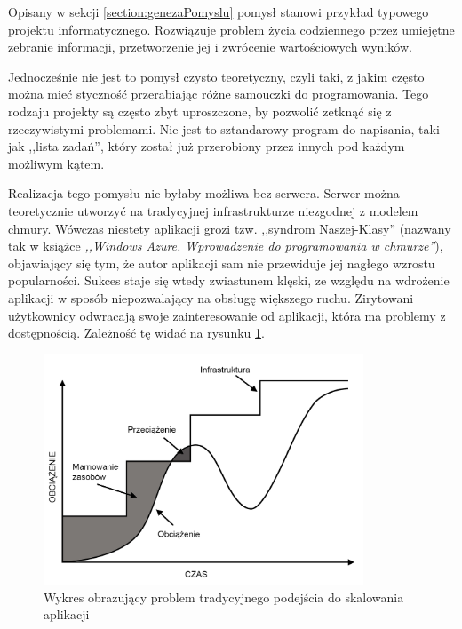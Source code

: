 \documentclass[12pt,a4paper,twoside,titlepage,openright]{book}
\begin{document}
Opisany w sekcji \ref{section:genezaPomyslu} pomysł stanowi przykład typowego projektu informatycznego. Rozwiązuje problem życia codziennego przez umiejętne zebranie informacji, przetworzenie jej i zwrócenie wartościowych wyników. 

Jednocześnie nie jest to pomysł czysto teoretyczny, czyli taki, z jakim często można mieć styczność przerabiając różne samouczki do programowania. Tego rodzaju projekty są często zbyt uproszczone, by pozwolić zetknąć się z rzeczywistymi problemami. Nie jest to sztandarowy program do napisania, taki jak ,,lista zadań'', który został już przerobiony przez innych pod każdym możliwym kątem.

Realizacja tego pomysłu nie byłaby możliwa bez serwera. Serwer można teoretycznie utworzyć na tradycyjnej infrastrukturze niezgodnej z modelem chmury. Wówczas niestety aplikacji grozi tzw. ,,syndrom Naszej-Klasy'' (nazwany tak w książce \textit{,,Windows Azure. Wprowadzenie do programowania w chmurze''}), objawiający się tym, że autor aplikacji sam nie przewiduje jej nagłego wzrostu popularności. Sukces staje się wtedy zwiastunem klęski, ze względu na wdrożenie aplikacji w sposób niepozwalający na obsługę większego ruchu. Zirytowani użytkownicy odwracają swoje zainteresowanie od aplikacji, która ma problemy z dostępnością. \cite{windowsAzureWprowadzenie} Zależność tę widać na rysunku \ref{fig:nasza-klasa}.

\begin{figure}[h]
	\centering
			\includegraphics[width=0.85\textwidth]{nasza-klasa.png}
		\caption{Wykres obrazujący problem tradycyjnego podejścia do skalowania aplikacji \cite{windowsAzureWprowadzenie}}
		\label{fig:nasza-klasa}
\end{figure}
\end{document}
